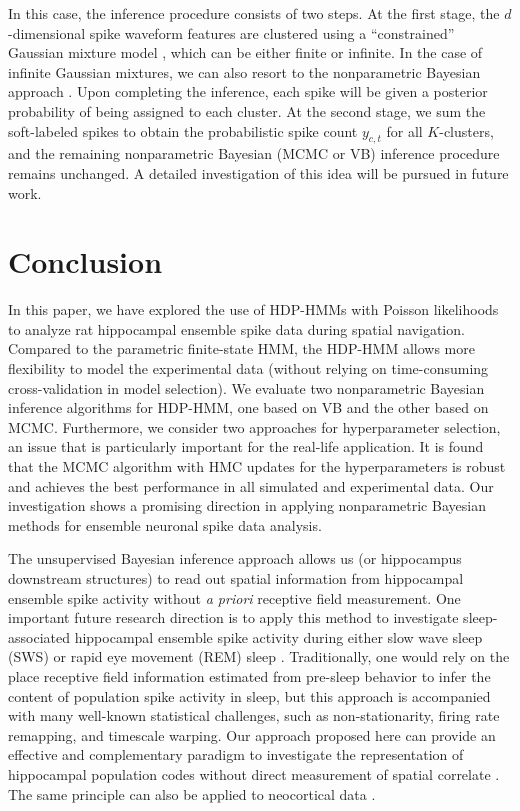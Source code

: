 In this case, the inference procedure consists of two steps. At the
first stage, the $d$-dimensional spike waveform features are clustered
using a ``constrained'' Gaussian mixture model \citep{Zou12}, which
can be either finite or infinite. In the case of infinite Gaussian
mixtures, we can also resort to the nonparametric Bayesian approach
\citep{Rasmussen99,Gorur10,Wood08}. Upon completing the inference,
each spike will be given a posterior probability of being assigned to
each cluster.  At the second stage, we sum the soft-labeled spikes to
obtain the probabilistic spike count $y_{c,t}$ for all $K$-clusters,
and the remaining nonparametric Bayesian (MCMC or VB) inference
procedure remains unchanged. A detailed investigation of this idea
will be pursued in future work.




\section{Conclusion}

In this paper, we have explored the use of HDP-HMMs with Poisson
likelihoods to analyze rat hippocampal ensemble spike data during
spatial navigation. Compared to the parametric finite-state HMM, the
HDP-HMM allows more flexibility to model the experimental data
(without relying on time-consuming cross-validation in model
selection). We evaluate two nonparametric Bayesian inference
algorithms for HDP-HMM, one based on VB and the other based on
MCMC. Furthermore, we consider two approaches for hyperparameter
selection, an issue that is particularly important for the real-life
application.  It is found that the MCMC algorithm with HMC updates for
the hyperparameters is robust and achieves the best performance in all
simulated and experimental data. Our investigation shows a promising
direction in applying nonparametric Bayesian methods for ensemble
neuronal spike data analysis.

The unsupervised Bayesian inference approach allows us (or hippocampus
downstream structures) to read out spatial information from
hippocampal ensemble spike activity without {\em a priori} receptive
field measurement.  One important future research direction is to
apply this method to investigate sleep-associated hippocampal ensemble
spike activity during either slow wave sleep (SWS) or rapid eye
movement (REM) sleep \citep{Louie01,Lee02}. Traditionally, one would
rely on the place receptive field information estimated from pre-sleep
behavior to infer the content of population spike activity in sleep,
but this approach is accompanied with many well-known statistical
challenges, such as non-stationarity, firing rate remapping, and
timescale warping. Our approach proposed here can provide an effective
and complementary paradigm to investigate the representation of
hippocampal population codes without direct measurement of spatial
correlate \citep{Chen15}. The same principle can also be applied to
neocortical data \citep{Ji07,Peyrache09,Gulati14}.


